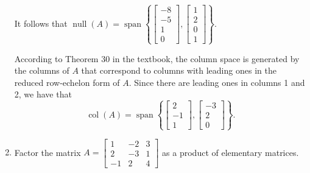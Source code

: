 \documentclass[letterpaper,12pt]{article}
\newcommand{\bbm}{\begin{bmatrix}}
\newcommand{\ebm}{\end{bmatrix}}
\begin{document}
\begin{enumerate}
\[\]
It follows that $\operatorname{null}(A) = \operatorname{span}\left\{\bbm -8\\-5\\1\\0\ebm, \bbm 1\\2\\0\\1\ebm\right\}$.

\medskip

According to Theorem 30 in the textbook, the column space is generated by the columns of $A$ that correspond to columns with leading ones in the reduced row-echelon form of $A$. Since there are leading ones in columns 1 and 2, we have that
\[
 \operatorname{col}(A) = \operatorname{span}\left\{\bbm 2\\-1\\1\ebm, \bbm -3\\2\\0\ebm\right\}.
\]


\item Factor the matrix $A = \bbm 1&-2&3\\2&-3&1\\-1&2&4\ebm$ as a product of elementary matrices.

\bigskip


\end{enumerate}
\end{document}
